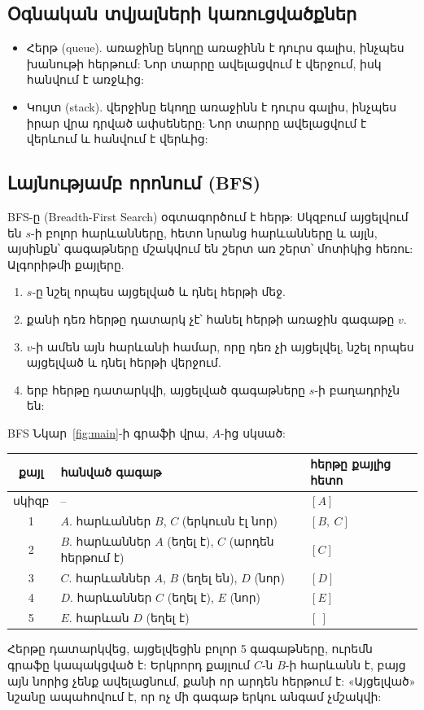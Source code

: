 \subsection{Օգնական տվյալների կառուցվածքներ}

\begin{itemize}
  \item Հերթ (queue). առաջինը եկողը առաջինն է դուրս գալիս, ինչպես խանութի հերթում: Նոր տարրը ավելացվում է վերջում, իսկ հանվում է առջևից:
  \item Կույտ (stack). վերջինը եկողը առաջինն է դուրս գալիս, ինչպես իրար վրա դրված ափսեները: Նոր տարրը ավելացվում է վերևում և հանվում է վերևից:
\end{itemize}

\subsection{Լայնությամբ որոնում (BFS)}

BFS-ը (Breadth-First Search) օգտագործում է հերթ: Սկզբում այցելվում են $s$-ի բոլոր հարևանները, հետո նրանց հարևանները և այլն, այսինքն՝ գագաթները մշակվում են շերտ առ շերտ՝ մոտիկից հեռու: Ալգորիթմի քայլերը.
\begin{enumerate}
  \item $s$-ը նշել որպես այցելված և դնել հերթի մեջ.
  \item քանի դեռ հերթը դատարկ չէ՝ հանել հերթի առաջին գագաթը $v$.
  \item $v$-ի ամեն այն հարևանի համար, որը դեռ չի այցելվել, նշել որպես այցելված և դնել հերթի վերջում.
  \item երբ հերթը դատարկվի, այցելված գագաթները $s$-ի բաղադրիչն են:
\end{enumerate}

\begin{example}\label{ex:bfs}
BFS Նկար~\ref{fig:main}-ի գրաֆի վրա, $A$-ից սկսած:
\begin{center}
\begin{tabular}{c|l|l}
քայլ & հանված գագաթ & հերթը քայլից հետո\\
\hline
սկիզբ & -- & $[A]$\\
1 & $A$. հարևաններ $B$, $C$ (երկուսն էլ նոր) & $[B,\ C]$\\
2 & $B$. հարևաններ $A$ (եղել է), $C$ (արդեն հերթում է) & $[C]$\\
3 & $C$. հարևաններ $A$, $B$ (եղել են), $D$ (նոր) & $[D]$\\
4 & $D$. հարևաններ $C$ (եղել է), $E$ (նոր) & $[E]$\\
5 & $E$. հարևան $D$ (եղել է) & $[\ ]$\\
\end{tabular}
\end{center}
Հերթը դատարկվեց, այցելվեցին բոլոր 5 գագաթները, ուրեմն գրաֆը կապակցված է: Երկրորդ քայլում $C$-ն $B$-ի հարևանն է, բայց այն նորից չենք ավելացնում, քանի որ արդեն հերթում է: «Այցելված» նշանը ապահովում է, որ ոչ մի գագաթ երկու անգամ չմշակվի:
\end{example}

